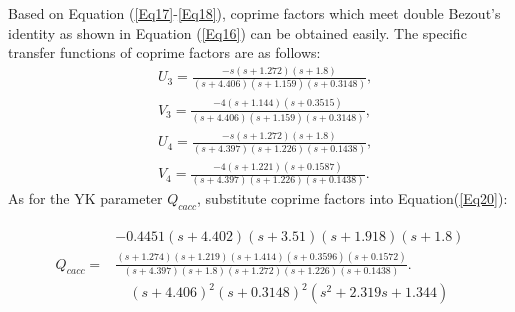 \documentclass[journal]{IEEEtran}
\begin{document}
Based on Equation (\ref{Eq17}-\ref{Eq18}), coprime factors which meet double Bezout's identity as shown in Equation (\ref{Eq16}) can be obtained easily. The specific transfer functions of coprime factors are as follows:
\begin{equation}
  \begin{aligned}
     & U_{3}=\frac{-s(s+1.272)(s+1.8)}{(s+4.406)(s+1.159)(s+0.3148)},    \\
     & V_{3}=\frac{-4(s+1.144)(s+0.3515)}{(s+4.406)(s+1.159)(s+0.3148)}, \\
     & U_{4}=\frac{-s(s+1.272)(s+1.8)}{(s+4.397)(s+1.226)(s+0.1438)},    \\
     & V_{4}=\frac{-4(s+1.221)(s+0.1587)}{(s+4.397)(s+1.226)(s+0.1438)}.
  \end{aligned}
\end{equation}
As for the YK parameter $Q_{cacc}$, substitute coprime factors into Equation(\ref{Eq20}):
\begin{small}
  \begin{equation}
    \begin{gathered}
      \begin{aligned}
                     & -0.4451(s+4.402)(s+3.51)(s+1.918)(s+1.8)                                                              \\
        Q_{c a c c}= & \frac{(s+1.274)(s+1.219)(s+1.414)(s+0.3596)(s+0.1572)}{(s+4.397)(s+1.8)(s+1.272)(s+1.226)(s+0.1438)}. \\
                     & \quad (s+4.406)^{2}(s+0.3148)^{2}\left(s^{2}+2.319 s+1.344\right)
      \end{aligned}
    \end{gathered}
  \end{equation}
\end{small}
\end{document}
